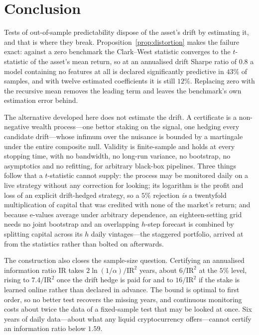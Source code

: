 \documentclass{article}
\theoremstyle{plain}
\theoremstyle{definition}
\begin{document}
\section{Conclusion}

Tests of out-of-sample predictability dispose of the asset's drift by estimating it, and
that is where they break. Proposition~\ref{prop:distortion} makes the failure exact: against
a zero benchmark the Clark--West statistic converges to the $t$-statistic of the asset's mean
return, so at an annualised drift Sharpe ratio of $0.8$ a model containing no features at all
is declared significantly predictive in $43\%$ of samples, and with twelve estimated
coefficients it is still $12\%$. Replacing zero with the recursive mean removes the leading term and leaves the
benchmark's own estimation error behind.

The alternative developed here does not estimate the drift. A certificate is a non-negative
wealth process---one bettor staking on the signal, one hedging every candidate drift---whose
infimum over the nuisance is bounded by a martingale under the entire composite null.
Validity is finite-sample and holds at every stopping time, with no bandwidth, no long-run
variance, no bootstrap, no asymptotics and no refitting, for arbitrary black-box pipelines.
Three things follow that a $t$-statistic cannot supply: the process may be monitored daily on
a live strategy without any correction for looking; its logarithm is the profit and loss of
an explicit drift-hedged strategy, so a $5\%$ rejection \emph{is} a twentyfold multiplication
of capital that was credited with none of the market's return; and because e-values average
under arbitrary dependence, an eighteen-setting grid needs no joint bootstrap and an
overlapping $h$-step forecast is combined by splitting capital across its $h$ daily
vintages---the staggered portfolio, arrived at from the statistics rather than bolted on
afterwards.

The construction also closes the sample-size question. Certifying an annualised information
ratio $\mathrm{IR}$ takes $2\ln(1/\alpha)/\mathrm{IR}^2$ years, about $6/\mathrm{IR}^2$ at
the $5\%$ level, rising to $7.4/\mathrm{IR}^2$ once the drift hedge is paid for and to
$16/\mathrm{IR}^2$ if the stake is learned online rather than declared in advance. The bound
is optimal to first order, so no better test recovers the missing years, and continuous
monitoring costs about twice the data of a fixed-sample test that may be looked at once. Six years of daily data---about what any liquid cryptocurrency offers---cannot certify
an information ratio below $1.59$.
\end{document}
